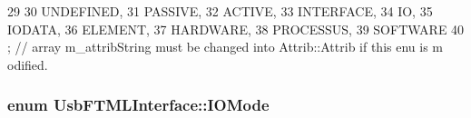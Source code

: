 \begin{DoxyCode}
29                 {
30     UNDEFINED,
31     PASSIVE,
32     ACTIVE,
33     INTERFACE,
34     IO,
35     IODATA,
36     ELEMENT,
37     HARDWARE,
38     PROCESSUS,
39     SOFTWARE 
40   }; // array m_attribString must be changed into Attrib::Attrib if this enu is m
      odified. 
\end{DoxyCode}
\hypertarget{classUsbFTMLInterface_a181227ebb27454964e5b6d185432498d}{
\subsubsection[{IOMode}]{\setlength{\rightskip}{0pt plus 5cm}enum {\bf UsbFTMLInterface::IOMode}}}
\label{classUsbFTMLInterface_a181227ebb27454964e5b6d185432498d}
